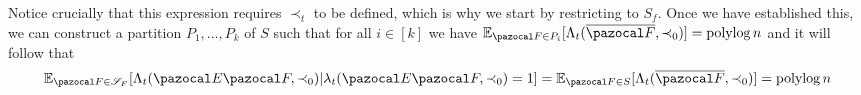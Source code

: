\documentclass{report}
\DeclareMathOperator*{\polylog}{polylog}
\begin{document}
Notice crucially that this expression requires $\prec_t$ to be defined, which is why we start by restricting to $S_f$. Once we have established this, we can construct a partition $P_1,...,P_k$ of $S$ such that for all $i \in [k]$ we have $\mathbb E_{\pazocal F \in P_i}[\Lambda_t(\overline{\pazocal F}, \prec_0)] = \polylog n$ and it will follow that
\[ \mathbb E_{\pazocal F \in \mathcal S_F} [\Lambda_t(\pazocal E \pazocal F, \prec_0) \vert \lambda_t(\pazocal E \pazocal F, \prec_0) = 1] = \mathbb E_{\pazocal F \in S} [\Lambda_t(\overline{\pazocal F}, \prec_0)]= \polylog n \]






\end{document}
